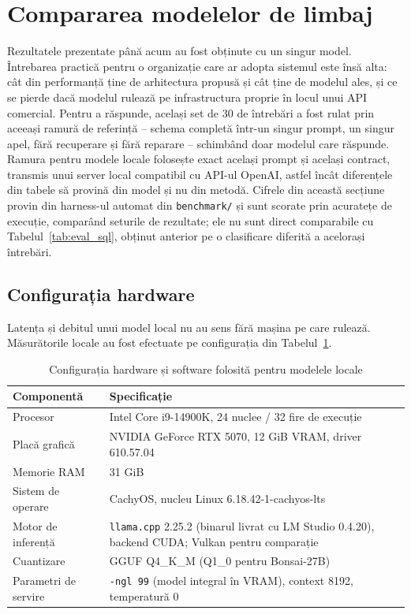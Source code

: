 \documentclass[12pt, a4paper]{report}
\newcommand{\code}[1]{\texttt{#1}}
\begin{document}
\section{Compararea modelelor de limbaj}

Rezultatele prezentate până acum au fost obținute cu un singur model. Întrebarea
practică pentru o organizație care ar adopta sistemul este însă alta: cât din
performanță ține de arhitectura propusă și cât ține de modelul ales, și ce se
pierde dacă modelul rulează pe infrastructura proprie în locul unui API
comercial. Pentru a răspunde, același set de 30 de întrebări a fost rulat prin
aceeași ramură de referință -- schema completă într-un singur prompt, un singur
apel, fără recuperare și fără reparare -- schimbând doar modelul care răspunde.
Ramura pentru modele locale folosește exact același prompt și același contract,
transmis unui server local compatibil cu API-ul OpenAI, astfel încât diferențele
din tabele să provină din model și nu din metodă. Cifrele din această secțiune
provin din harness-ul automat din \code{benchmark/} și sunt scorate prin
acuratețe de execuție, comparând seturile de rezultate; ele nu sunt direct
comparabile cu Tabelul~\ref{tab:eval_sql}, obținut anterior pe o clasificare
diferită a acelorași întrebări.

\subsection{Configurația hardware}

Latența și debitul unui model local nu au sens fără mașina pe care rulează.
Măsurătorile locale au fost efectuate pe configurația din
Tabelul~\ref{tab:hardware}.

\begin{table}[H]
\centering
\caption{Configurația hardware și software folosită pentru modelele locale}
\label{tab:hardware}
\begin{tabularx}{\textwidth}{l X}
\toprule
\textbf{Componentă} & \textbf{Specificație} \\
\midrule
Procesor & Intel Core i9-14900K, 24 nuclee / 32 fire de execuție \\
Placă grafică & NVIDIA GeForce RTX 5070, 12 GiB VRAM, driver 610.57.04 \\
Memorie RAM & 31 GiB \\
Sistem de operare & CachyOS, nucleu Linux 6.18.42-1-cachyos-lts \\
Motor de inferență & \code{llama.cpp} 2.25.2 (binarul livrat cu LM Studio 0.4.20), backend CUDA; Vulkan pentru comparație \\
Cuantizare & GGUF Q4\_K\_M (Q1\_0 pentru Bonsai-27B) \\
Parametri de servire & \code{-ngl 99} (model integral în VRAM), context 8192, temperatură 0 \\
\bottomrule
\end{tabularx}
\end{table}
\end{document}
